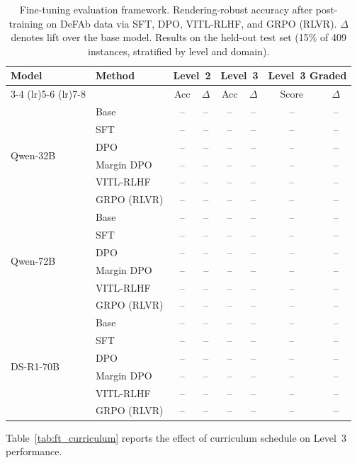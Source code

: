 \documentclass{article}
\theoremstyle{definition}
\begin{document}
\begin{table}[t]
\centering
\caption{Fine-tuning evaluation framework. Rendering-robust accuracy after post-training on DeFAb data via SFT, DPO, VITL-RLHF, and GRPO (RLVR). $\Delta$ denotes lift over the base model. Results on the held-out test set (15\% of 409 instances, stratified by level and domain).}
\label{tab:ft_main}
\small
\begin{tabular}{@{}llcccccc@{}}
\toprule
\multirow{2}{*}{Model} & \multirow{2}{*}{Method} & \multicolumn{2}{c}{Level~2} & \multicolumn{2}{c}{Level~3} & \multicolumn{2}{c}{Level~3 Graded} \\
\cmidrule(lr){3-4} \cmidrule(lr){5-6} \cmidrule(lr){7-8}
 & & Acc & $\Delta$ & Acc & $\Delta$ & Score & $\Delta$ \\
\midrule
\multirow{6}{*}{Qwen-32B} & Base & -- & -- & -- & -- & -- & -- \\
 & SFT & -- & -- & -- & -- & -- & -- \\
 & DPO & -- & -- & -- & -- & -- & -- \\
 & Margin DPO & -- & -- & -- & -- & -- & -- \\
 & VITL-RLHF & -- & -- & -- & -- & -- & -- \\
 & GRPO (RLVR) & -- & -- & -- & -- & -- & -- \\
\midrule
\multirow{6}{*}{Qwen-72B} & Base & -- & -- & -- & -- & -- & -- \\
 & SFT & -- & -- & -- & -- & -- & -- \\
 & DPO & -- & -- & -- & -- & -- & -- \\
 & Margin DPO & -- & -- & -- & -- & -- & -- \\
 & VITL-RLHF & -- & -- & -- & -- & -- & -- \\
 & GRPO (RLVR) & -- & -- & -- & -- & -- & -- \\
\midrule
\multirow{6}{*}{DS-R1-70B} & Base & -- & -- & -- & -- & -- & -- \\
 & SFT & -- & -- & -- & -- & -- & -- \\
 & DPO & -- & -- & -- & -- & -- & -- \\
 & Margin DPO & -- & -- & -- & -- & -- & -- \\
 & VITL-RLHF & -- & -- & -- & -- & -- & -- \\
 & GRPO (RLVR) & -- & -- & -- & -- & -- & -- \\
\bottomrule
\end{tabular}
\end{table}

Table~\ref{tab:ft_curriculum} reports the effect of curriculum schedule on Level~3 performance.
\end{document}
